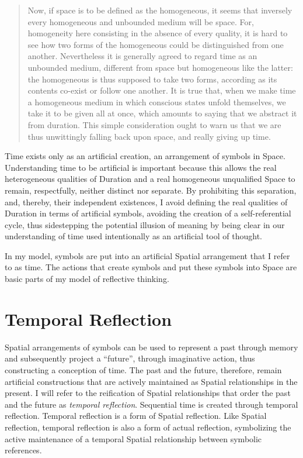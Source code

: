 \begin{quote}
Now, if space is to be defined as the homogeneous, it seems that
inversely every homogeneous and unbounded medium will be space.  For,
homogeneity here consisting in the absence of every quality, it is
hard to see how two forms of the homogeneous could be distinguished
from one another.  Nevertheless it is generally agreed to regard time
as an unbounded medium, different from space but homogeneous like the
latter: the homogeneous is thus supposed to take two forms, according
as its contents co-exist or follow one another.  It is true that, when
we make time a homogeneous medium in which conscious states unfold
themselves, we take it to be given all at once, which amounts to
saying that we abstract it from duration.  This simple consideration
ought to warn us that we are thus unwittingly falling back upon space,
and really giving up time.
\end{quote}

Time exists only as an artificial creation, an arrangement of symbols
in Space.  Understanding time to be artificial is important because
this allows the real heterogeneous qualities of Duration and a real
homogeneous unqualified Space to remain, respectfully, neither
distinct nor separate.  By prohibiting this separation, and, thereby,
their independent existences, I avoid defining the real qualities of
Duration in terms of artificial symbols, avoiding the creation of a
self-referential cycle, thus sidestepping the potential illusion of
meaning by being clear in our understanding of time used intentionally
as an artificial tool of thought.

In my model, symbols are put into an artificial Spatial arrangement
that I refer to as time.  The actions that create symbols and put
these symbols into Space are basic parts of my model of reflective
thinking.

\section{Temporal Reflection}

Spatial arrangements of symbols can be used to represent a past
through memory and subsequently project a ``future'', through
imaginative action, thus constructing a conception of time.  The past
and the future, therefore, remain artificial constructions that are
actively maintained as Spatial relationships in the present.  I will
refer to the reification of Spatial relationships that order the past
and the future as \emph{temporal reflection}.  Sequential time is
created through temporal reflection.  Temporal reflection is a form of
Spatial reflection.  Like Spatial reflection, temporal reflection is
also a form of actual reflection, symbolizing the active maintenance
of a temporal Spatial relationship between symbolic references.

